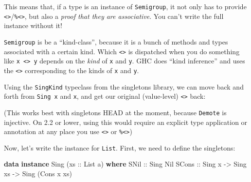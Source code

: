 \documentclass[]{article}
\newenvironment{Shaded}{}{}
\newcommand{\KeywordTok}[1]{\textcolor[rgb]{0.00,0.44,0.13}{\textbf{{#1}}}}
\newcommand{\DataTypeTok}[1]{\textcolor[rgb]{0.56,0.13,0.00}{{#1}}}
\newcommand{\OtherTok}[1]{\textcolor[rgb]{0.00,0.44,0.13}{{#1}}}
\newcommand{\FunctionTok}[1]{\textcolor[rgb]{0.02,0.16,0.49}{{#1}}}
\newcommand{\NormalTok}[1]{{#1}}
\begin{document}
This means that, if a type is an instance of \texttt{Semigroup}, it not only has
to provide
\texttt{\textless{}\textgreater{}}/\texttt{\%\textless{}\textgreater{}}, but
also a \emph{proof that they are associative}. You can't write the full instance
without it!

\texttt{Semigroup} is be a ``kind-class'', because it is a bunch of methods and
types associated with a certain kind. Which \texttt{\textless{}\textgreater{}}
is dispatched when you do something like
\texttt{x\ \textless{}\textgreater{}\ y} depends on the \emph{kind} of
\texttt{x} and \texttt{y}. GHC does ``kind inference'' and uses the
\texttt{\textless{}\textgreater{}} corresponding to the kinds of \texttt{x} and
\texttt{y}.

Using the \texttt{SingKind} typeclass from the singletons library, we can move
back and forth from \texttt{Sing\ x} and \texttt{x}, and get our original
(value-level) \texttt{\textless{}\textgreater{}} back:

\begin{Shaded}
\end{Shaded}

(This works best with singletons HEAD at the moment, because \texttt{Demote} is
injective. On 2.2 or lower, using this would require an explicit type
application or annotation at any place you use
\texttt{\textless{}\textgreater{}} or \texttt{\%\textless{}\textgreater{}})

Now, let's write the instance for \texttt{List}. First, we need to define the
singletons:

\begin{Shaded}
\begin{Highlighting}[]
\KeywordTok{data} \KeywordTok{instance} \DataTypeTok{Sing} \NormalTok{(}\OtherTok{xs ::} \DataTypeTok{List} \NormalTok{a) }\KeywordTok{where}
    \DataTypeTok{SNil}\OtherTok{  ::} \DataTypeTok{Sing} \DataTypeTok{Nil}
    \DataTypeTok{SCons}\OtherTok{ ::} \DataTypeTok{Sing} \NormalTok{x }\OtherTok{->} \DataTypeTok{Sing} \NormalTok{xs }\OtherTok{->} \DataTypeTok{Sing} \NormalTok{(}\DataTypeTok{Cons} \NormalTok{x xs)}
\end{Highlighting}
\end{Shaded}
\end{document}
